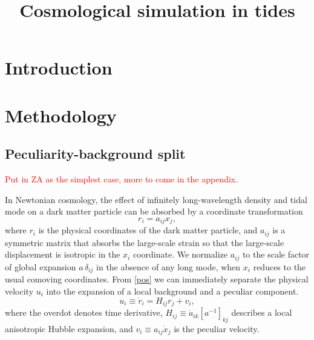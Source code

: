 \documentclass[a4paper,11pt]{article}
\title{Cosmological simulation in tides}
\newcommand{\HL}[1]{\textcolor{red}{#1}} %
\begin{document}
\maketitle

\section{Introduction}
\label{sec:intro}


\section{Methodology}
\label{sec:methodology}

\subsection{Peculiarity-background split}
\label{sub:split}

\HL{Put in ZA as the simplest case, more to come in the appendix.}

In Newtonian cosmology, the effect of infinitely long-wavelength density and
tidal mode on a dark matter particle can be absorbed by a coordinate
transformation
\begin{equation}
    r_i = a_{ij} x_j,
    \label{eq:pos}
\end{equation}
where $r_i$ is the physical coordinates of the dark matter particle, and
$a_{ij}$ is a symmetric matrix that absorbs the large-scale strain so that the
large-scale displacement is isotropic in the $x_i$ coordinate.
We normalize $a_{ij}$ to the scale factor of global expansion $a\,\delta_{ij}$
in the absence of any long mode, when $x_i$ reduces to the usual comoving
coordinates.
From \eqref{pos} we can immediately separate the physical velocity $u_i$ into
the expansion of a local background and a peculiar component.
\begin{equation}
    u_i \equiv \dot r_i = H_{ij} r_j + v_i,
    \label{eq:vel}
\end{equation}
where the overdot denotes time derivative, $H_{ij} \equiv \dot a_{ik}
[a^{-1}]_{kj}$ describes a local anisotropic Hubble expansion, and $v_i\equiv
a_{ij}\dot x_j$ is the peculiar velocity.
\end{document}
